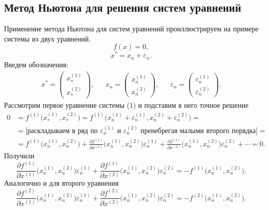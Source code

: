 \documentclass[a4paper,11pt]{article}
\begin{document}
\subsection{Метод Ньютона для решения систем уравнений}
Применение метода Ньютона для систем уравнений проиллюстрируем на примере системы из двух уравнений.
\begin{equation}
  f(x) = 0,
\end{equation}
\begin{equation*}
  x^* = x_n + \varepsilon_n.
\end{equation*}
Введем обозначения:
\begin{align*}
  x^* = \begin{pmatrix} x_*^{(1)} \\ x_*^(2) \end{pmatrix}, && x_n = \begin{pmatrix} x_n^{(1)} \\ x_n^(2) \end{pmatrix}, &&
  \varepsilon_n = \begin{pmatrix} \varepsilon_n^{(1)} \\ \varepsilon_n^(2) \end{pmatrix}.
\end{align*}
Рассмотрим первое уравнение системы ($1$) и подставим в него точное решение
\begin{align*}
  0 &= f^{(1)}\bigg( x_*^{(1)}, x_*^{(2)} \bigg) = f^{(1)}\bigg( x_n^{(1)}+\varepsilon_n^{(1)}, x_n^{(2)}+\varepsilon_n^{(2)} \bigg) = \\
  &= \bigg[\text{раскладываем в ряд по $\varepsilon_n^{(1)}$ и $\varepsilon_n^{(2)}$ пренебрегая малыми второго порядка} \bigg] = \\
  &= f^{(1)}\bigg( x_n^{(1)}, x_n^{(2)} \bigg) + \frac{\partial f^{(1)}}{\partial x^{(1)}} \bigg( x_n^{(1)}, x_n^{(2)} \bigg)\varepsilon_n^{(1)} +
    \frac{\partial f^{(1)}}{\partial x^{(2)}} \bigg( x_n^{(1)}, x_n^{(2)} \bigg)\varepsilon_n^{(2)} + \cdots = 0.
\end{align*}
Получили
\begin{equation}
  \frac{\partial f^{(1)}}{\partial x^{(1)}} \bigg( x_n^{(1)}, x_n^{(2)} \bigg)\varepsilon_n^{(1)} +
    \frac{\partial f^{(1)}}{\partial x^{(2)}} \bigg( x_n^{(1)}, x_n^{(2)} \bigg)\varepsilon_n^{(2)} = -f^{(1)}\bigg( x_n^{(1)}, x_n^{(2)} \bigg).
\end{equation}
Аналогично и для второго уравнения
\begin{equation}
  \frac{\partial f^{(2)}}{\partial x^{(1)}} \bigg( x_n^{(1)}, x_n^{(2)} \bigg)\varepsilon_n^{(1)} +
    \frac{\partial f^{(2)}}{\partial x^{(2)}} \bigg( x_n^{(1)}, x_n^{(2)} \bigg)\varepsilon_n^{(2)} = -f^{(2)}\bigg( x_n^{(1)}, x_n^{(2)} \bigg).
\end{equation}
\end{document}

